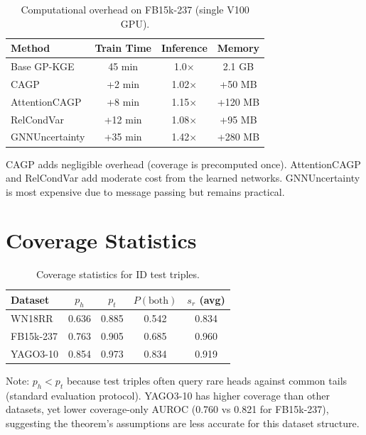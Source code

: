 \begin{table}[h]
\centering
\caption{Computational overhead on FB15k-237 (single V100 GPU).}
\begin{tabular}{lccc}
\toprule
Method & Train Time & Inference & Memory \\
\midrule
Base GP-KGE & 45 min & 1.0$\times$ & 2.1 GB \\
CAGP & +2 min & 1.02$\times$ & +50 MB \\
AttentionCAGP & +8 min & 1.15$\times$ & +120 MB \\
RelCondVar & +12 min & 1.08$\times$ & +95 MB \\
GNNUncertainty & +35 min & 1.42$\times$ & +280 MB \\
\bottomrule
\end{tabular}
\end{table}

CAGP adds negligible overhead (coverage is precomputed once). AttentionCAGP and RelCondVar add moderate cost from the learned networks. GNNUncertainty is most expensive due to message passing but remains practical.

\section{Coverage Statistics}
\label{app:coverage}

\begin{table}[h]
\centering
\caption{Coverage statistics for ID test triples.}
\begin{tabular}{lcccc}
\toprule
Dataset & $p_h$ & $p_t$ & $P(\text{both})$ & $s_r$ (avg) \\
\midrule
WN18RR & 0.636 & 0.885 & 0.542 & 0.834 \\
FB15k-237 & 0.763 & 0.905 & 0.685 & 0.960 \\
YAGO3-10 & 0.854 & 0.973 & 0.834 & 0.919 \\
\bottomrule
\end{tabular}
\end{table}

Note: $p_h < p_t$ because test triples often query rare heads against common tails (standard evaluation protocol).
YAGO3-10 has higher coverage than other datasets, yet lower coverage-only AUROC (0.760 vs 0.821 for FB15k-237), suggesting the theorem's assumptions are less accurate for this dataset structure.
